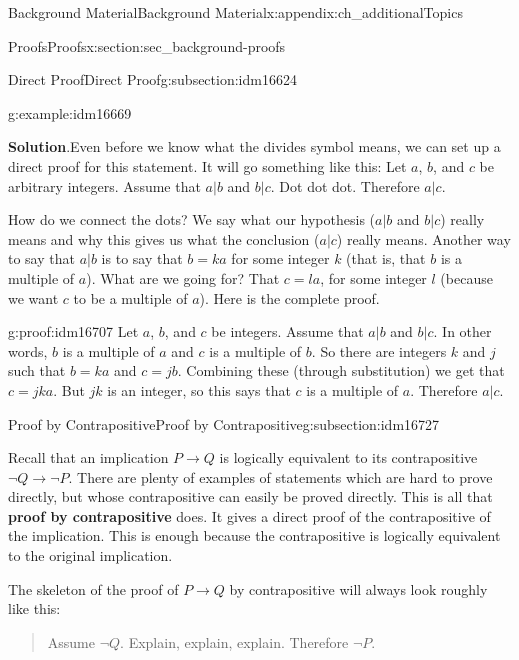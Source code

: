 \documentclass[oneside,10pt,]{book}
\newcommand{\terminology}[1]{\textbf{#1}}
\numberwithin{equation}{chapter}
\def\imp{\rightarrow}
\begin{document}
\begin{appendixptx}{Background Material}{}{Background Material}{}{}{x:appendix:ch_additionalTopics}
\begin{sectionptx}{Proofs}{}{Proofs}{}{}{x:section:sec_background-proofs}
\begin{subsectionptx}{Direct Proof}{}{Direct Proof}{}{}{g:subsection:idm16624}
\begin{example}{}{g:example:idm16669}
\par\smallskip%
\noindent\textbf{Solution}.\hypertarget{g:solution:idm16686}{}\quad{}Even before we know what the divides symbol means, we can set up a direct proof for this statement. It will go something like this: Let \(a\), \(b\), and \(c\) be arbitrary integers. Assume that \(a|b\) and \(b|c\). Dot dot dot. Therefore \(a|c\).%
\par
How do we connect the dots? We say what our hypothesis (\(a|b\) and \(b|c\)) really means and why this gives us what the conclusion (\(a|c\)) really means. Another way to say that \(a|b\) is to say that \(b = ka\) for some integer \(k\) (that is, that \(b\) is a multiple of \(a\)). What are we going for? That \(c = la\), for some integer \(l\) (because we want \(c\) to be a multiple of \(a\)). Here is the complete proof.%
\begin{proofptx}{}{g:proof:idm16707}
Let \(a\), \(b\), and \(c\) be integers. Assume that \(a|b\) and \(b|c\). In other words, \(b\) is a multiple of \(a\) and \(c\) is a multiple of \(b\). So there are integers \(k\) and \(j\) such that \(b = ka\) and \(c = jb\). Combining these (through substitution) we get that \(c = jka\). But \(jk\) is an integer, so this says that \(c\) is a multiple of \(a\). Therefore \(a|c\).%
\end{proofptx}
\end{example}
\end{subsectionptx}
%
%
\typeout{************************************************}
\typeout{************************************************}
%
\begin{subsectionptx}{Proof by Contrapositive}{}{Proof by Contrapositive}{}{}{g:subsection:idm16727}
%
\par
Recall that an implication \(P \imp Q\) is logically equivalent to its contrapositive \(\neg Q \imp \neg P\). There are plenty of examples of statements which are hard to prove directly, but whose contrapositive can easily be proved directly. This is all that \terminology{proof by contrapositive} does. It gives a direct proof of the contrapositive of the implication. This is enough because the contrapositive is logically equivalent to the original implication.%
\par
The skeleton of the proof of \(P \imp Q\) by contrapositive will always look roughly like this:%
\begin{quote}%
Assume \(\neg Q\). Explain, explain, \textellipsis{} explain. Therefore \(\neg P\).%

\end{quote}
\end{subsectionptx}
\end{sectionptx}
\end{appendixptx}
\end{document}
